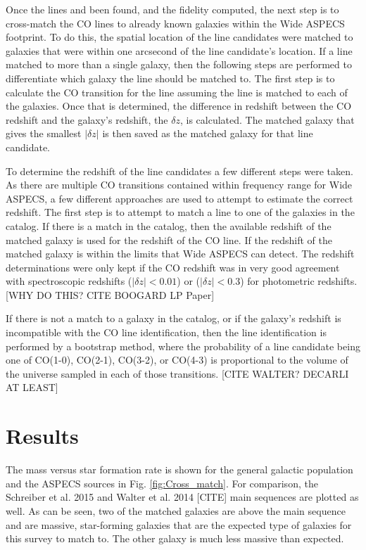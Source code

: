Once the lines and been found, and the fidelity computed, the next step is to cross-match the CO lines to already known galaxies within the Wide ASPECS footprint. To do this, the spatial location of the line candidates were matched to galaxies that were within one arcsecond of the line candidate's location. If a line matched to more than a single galaxy, then the following steps are performed to differentiate which galaxy the line should be matched to. The first step is to calculate the CO transition for the line assuming the line is matched to each of the galaxies. Once that is determined, the difference in redshift between the CO redshift and the galaxy's redshift, the $\delta z$, is calculated. The matched galaxy that gives the smallest $|\delta z|$ is then saved as the matched galaxy for that line candidate. 

To determine the redshift of the line candidates a few different steps were taken. As there are multiple CO transitions contained within frequency range for Wide ASPECS, a few different approaches are used to attempt to estimate the correct redshift. The first step is to attempt to match a line to one of the galaxies in the catalog. If there is a match in the catalog, then the available redshift of the matched galaxy is used for the redshift of the CO line. If the redshift of the matched galaxy is within the limits that Wide ASPECS can detect. The redshift determinations were only kept if the CO redshift was in very good agreement with spectroscopic redshifts ($|\delta z| < 0.01$) or ($|\delta z| < 0.3$) for photometric redshifts. [WHY DO THIS? CITE BOOGARD LP Paper]

If there is not a match to a galaxy in the catalog, or if the galaxy's redshift is incompatible with the CO line identification, then the line identification is performed by a bootstrap method, where the probability of a line candidate being one of CO(1-0), CO(2-1), CO(3-2), or CO(4-3) is proportional to the volume of the universe sampled in each of those transitions. [CITE WALTER? DECARLI AT LEAST] 

\section{Results}

The mass versus star formation rate is shown for the general galactic population and the ASPECS sources in Fig. \ref{fig:Cross_match}. For comparison, the Schreiber et al. 2015 \cite{schreiber2015herschel} and Walter et al. 2014 [CITE] main sequences are plotted as well. As can be seen, two of the matched galaxies are above the main sequence and are massive, star-forming galaxies that are the expected type of galaxies for this survey to match to. The other galaxy is much less massive than expected.


